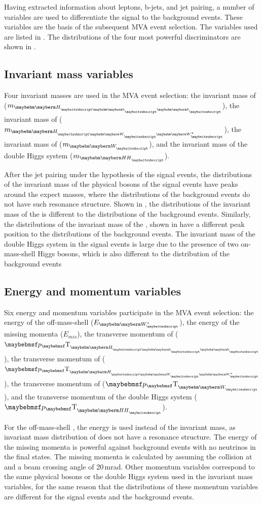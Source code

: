 Having extracted information about leptons, b-jets, and jet pairing, a number of variables are used to differentiate the signal to the background events. These variables are the basis of the subsequent MVA event selection. The variables used are listed in . The distributions of the four most powerful discriminators are shown in .

\subsection{Invariant mass  variables}

Four invariant masses are used in the MVA event selection: the invariant mass of  \Hbb ($m_{\Hbb}$), the invariant mass of  \HWW ($m_{\HWW}$), the invariant mass of  \PW ($m_{\PW}$), and the invariant mass of the double Higgs system ($m_{\HH}$).

After the jet pairing under the hypothesis of the signal events, the distributions of the invariant mass of the physical bosons of the signal events have peaks around the expect masses, where the distributions of the  background events do not have such resonance structure. Shown in , the distributions of the invariant mass of the \Hbb is  different to the distributions of the background events. Similarly, the distributions of the invariant mass of the \HWW, shown in  have a different peak position to the distributions of the background events.  The invariant mass of the double Higgs system in the signal events is large due to the presence of two on-mass-shell Higgs bosons, which is also different to the distribution of the background events

\subsection{Energy and momentum variables}

Six energy and momentum variables participate in the MVA event selection: the energy of the off-mass-shell \PW ($E_{\W*}$), the energy of the missing momenta ($E_{mis}$), the transverse momentum of \Hbb ($\pT_{\Hbb}$), the transverse momentum of \HWW ($\pT_{\HWW}$), the transverse momentum of \PW ($\pT_{\PW}$), and the transverse momentum of the double Higgs system ($\pT_{\HH}$).

For the off-mass-shell \PW, the energy  is used instead of the invariant mass, as invariant mass distribution of \W* does not have a resonance structure. The energy of the missing momenta is powerful against background events with no neutrinos in the final states. The missing momenta is calculated by assuming the collision at \sqrtS and a beam crossing angle of 20\,mrad. Other momentum variables correspond to the same physical bosons or the double Higgs system used in  the invariant mass  variables, for the same reason that the distributions of these momentum variables are different for the signal events and the background events.


